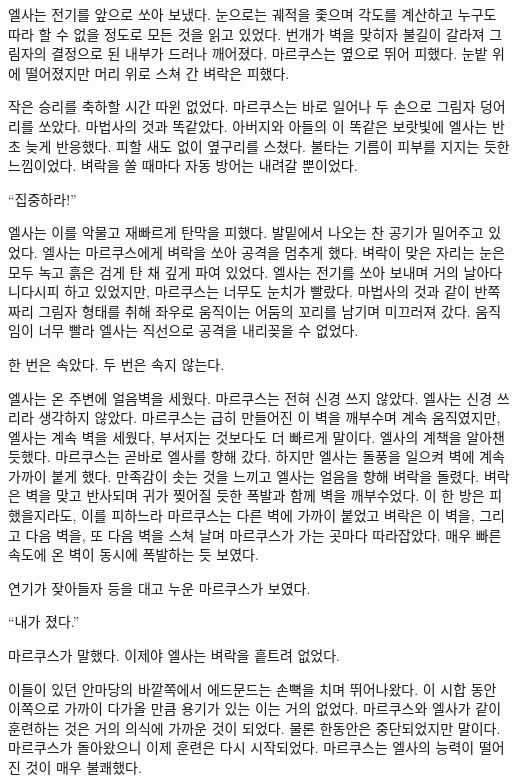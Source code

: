 엘사는 전기를 앞으로 쏘아 보냈다. 눈으로는 궤적을 좇으며 각도를 계산하고 누구도 따라 할 수 없을 정도로 모든 것을 읽고 있었다. 번개가 벽을 맞히자 불길이 갈라져 그림자의 결정으로 된 내부가 드러나 깨어졌다. 마르쿠스는 옆으로 뛰어 피했다. 눈밭 위에 떨어졌지만 머리 위로 스쳐 간 벼락은 피했다.

작은 승리를 축하할 시간 따윈 없었다. 마르쿠스는 바로 일어나 두 손으로 그림자 덩어리를 쏘았다. 마법사의 것과 똑같았다. 아버지와 아들의 이 똑같은 보랏빛에 엘사는 반 초 늦게 반응했다. 피할 새도 없이 옆구리를 스쳤다. 불타는 기름이 피부를 지지는 듯한 느낌이었다. 벼락을 쏠 때마다 자동 방어는 내려갈 뿐이었다.

``집중하라!''

엘사는 이를 악물고 재빠르게 탄막을 피했다. 발밑에서 나오는 찬 공기가 밀어주고 있었다. 엘사는 마르쿠스에게 벼락을 쏘아 공격을 멈추게 했다. 벼락이 맞은 자리는 눈은 모두 녹고 흙은 검게 탄 채 깊게 파여 있었다. 엘사는 전기를 쏘아 보내며 거의 날아다니다시피 하고 있었지만, 마르쿠스는 너무도 눈치가 빨랐다. 마법사의 것과 같이 반쪽짜리 그림자 형태를 취해 좌우로 움직이는 어둠의 꼬리를 남기며 미끄러져 갔다. 움직임이 너무 빨라 엘사는 직선으로 공격을 내리꽂을 수 없었다.

한 번은 속았다. 두 번은 속지 않는다.

엘사는 온 주변에 얼음벽을 세웠다. 마르쿠스는 전혀 신경 쓰지 않았다. 엘사는 신경 쓰리라 생각하지 않았다. 마르쿠스는 급히 만들어진 이 벽을 깨부수며 계속 움직였지만, 엘사는 계속 벽을 세웠다, 부서지는 것보다도 더 빠르게 말이다. 엘사의 계책을 알아챈 듯했다. 마르쿠스는 곧바로 엘사를 향해 갔다. 하지만 엘사는 돌풍을 일으켜 벽에 계속 가까이 붙게 했다. 만족감이 솟는 것을 느끼고 엘사는 얼음을 향해 벼락을 돌렸다. 벼락은 벽을 맞고 반사되며 귀가 찢어질 듯한 폭발과 함께 벽을 깨부수었다. 이 한 방은 피했을지라도, 이를 피하느라 마르쿠스는 다른 벽에 가까이 붙었고 벼락은 이 벽을, 그리고 다음 벽을, 또 다음 벽을 스쳐 날며 마르쿠스가 가는 곳마다 따라잡았다. 매우 빠른 속도에 온 벽이 동시에 폭발하는 듯 보였다.

연기가 잦아들자 등을 대고 누운 마르쿠스가 보였다.

``내가 졌다.''

마르쿠스가 말했다. 이제야 엘사는 벼락을 흩트려 없었다.

이들이 있던 안마당의 바깥쪽에서 에드문드는 손뼉을 치며 뛰어나왔다. 이 시합 동안 이쪽으로 가까이 다가올 만큼 용기가 있는 이는 거의 없었다. 마르쿠스와 엘사가 같이 훈련하는 것은 거의 의식에 가까운 것이 되었다. 물론 한동안은 중단되었지만 말이다. 마르쿠스가 돌아왔으니 이제 훈련은 다시 시작되었다. 마르쿠스는 엘사의 능력이 떨어진 것이 매우 불쾌했다.


